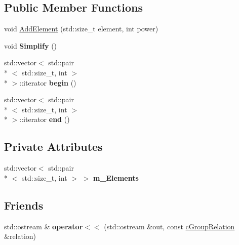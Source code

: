 \subsection*{Public Member Functions}
\begin{DoxyCompactItemize}
\item 
void \hyperlink{classcGroupRelation_ab02575ade57648d354388c57eca2be8a}{Add\-Element} (std\-::size\-\_\-t element, int power)
\item 
\hypertarget{classcGroupRelation_a3552e7ecdb7235d150e04a7041a958ba}{void {\bfseries Simplify} ()}\label{classcGroupRelation_a3552e7ecdb7235d150e04a7041a958ba}

\item 
\hypertarget{classcGroupRelation_a5801f724ac35ff61da1cab0605116322}{std\-::vector$<$ std\-::pair\\*
$<$ std\-::size\-\_\-t, int $>$\\*
 $>$\-::iterator {\bfseries begin} ()}\label{classcGroupRelation_a5801f724ac35ff61da1cab0605116322}

\item 
\hypertarget{classcGroupRelation_a9d6069b99a7503204f2375c4f022b556}{std\-::vector$<$ std\-::pair\\*
$<$ std\-::size\-\_\-t, int $>$\\*
 $>$\-::iterator {\bfseries end} ()}\label{classcGroupRelation_a9d6069b99a7503204f2375c4f022b556}

\end{DoxyCompactItemize}
\subsection*{Private Attributes}
\begin{DoxyCompactItemize}
\item 
\hypertarget{classcGroupRelation_a271a57882ceaa8f05bafcd52e492222b}{std\-::vector$<$ std\-::pair\\*
$<$ std\-::size\-\_\-t, int $>$ $>$ {\bfseries m\-\_\-\-Elements}}\label{classcGroupRelation_a271a57882ceaa8f05bafcd52e492222b}

\end{DoxyCompactItemize}
\subsection*{Friends}
\begin{DoxyCompactItemize}
\item 
\hypertarget{classcGroupRelation_a70c0a9c197f1e6ad8b4db08266e3e2ea}{std\-::ostream \& {\bfseries operator$<$$<$} (std\-::ostream \&out, const \hyperlink{classcGroupRelation}{c\-Group\-Relation} \&relation)}\label{classcGroupRelation_a70c0a9c197f1e6ad8b4db08266e3e2ea}

\end{DoxyCompactItemize}


